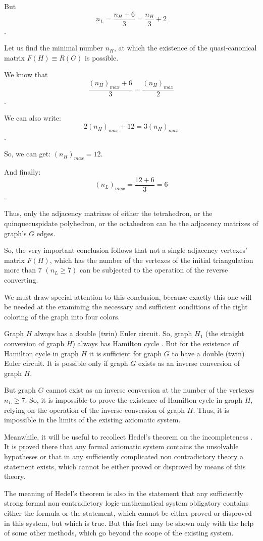 \documentclass{amsart}
\theoremstyle{plain}
\numberwithin{equation}{section}
\begin{document}
But
$$n_L=\frac{n_H+6}{3}=\frac{n_H}{3}+2$$.

Let us find the minimal number $n_H$, at which the existence of the quasi-canonical matrix $F(H) \equiv R(G)$ is possible.

We know that
 $$\frac{(n_H)_{max}+6}{3}=\frac{(n_H)_{max}}{2}$$. 

We can also write: 
$$2(n_H)_{max}+12=3(n_H)_{max}$$. 

So, we can get: $(n_H)_{max}=12$.

And finally: 
$$(n_L)_{max}=\frac{12+6}{3}=6$$.

Thus, only the adjacency matrixes of either the tetrahedron, or the quinquecuspidate polyhedron, or the octahedron can be the adjacency matrixes of graph's $G$ edges.

So, the very important conclusion follows that not a single adjacency vertexes' matrix $F(H)$, which has the number of the vertexes of the initial triangulation more than $7$ $(n_L \ge 7)$ can be subjected to the operation of the reverse converting.

We must draw special attention to this conclusion, because exactly this one will be needed at the examining the necessary and sufficient conditions of the right coloring of the graph into four colors.

Graph $H$ always has a double (twin) Euler circuit. So, graph $H_1$ (the straight conversion of graph $H$) always has Hamilton cycle \cite {Malinin}. But for the existence of Hamilton cycle in graph $H$ it is sufficient for graph $G$ to have a double (twin) Euler circuit. It is possible only if graph $G$ exists as an inverse conversion of graph $H$.

But graph $G$ cannot exist as an inverse conversion at the number of the vertexes $n_L \ge 7$. So, it is impossible to prove the existence of Hamilton cycle in graph $H$, relying on the operation of the inverse conversion of graph $H$. Thus, it is impossible in the limits of the existing axiomatic system.

Meanwhile, it will be useful to recollect Hedel's theorem on the incompleteness \cite {Hedel}. It is proved there that any formal axiomatic system contains the unsolvable hypotheses or that in any sufficiently complicated non contradictory theory a statement exists, which cannot be either proved or disproved by means of this theory.

The meaning of Hedel's theorem is also in the statement that any sufficiently strong formal non contradictory logic-mathematical system obligatory contains either the formula or the statement, which cannot be either proved or disproved in this system, but which is true. But this fact may be shown only with the help of some other methods, which go beyond the scope of the existing system. 
\end{document}
